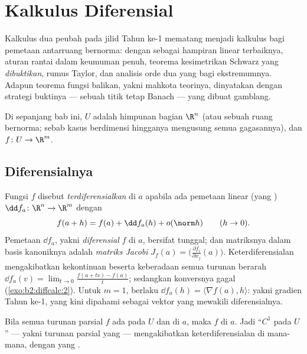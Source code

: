 \chapter{Kalkulus Diferensial}\label{ch:b2:diffcalc}

Kalkulus dua peubah pada jilid Tahun ke-1 mematang menjadi
kalkulus  bagi pemetaan antarruang bernorma: dengan
\emph{} sebagai hampiran linear terbaiknya, aturan rantai
dalam keumuman penuh, teorema kesimetrikan Schwarz yang \emph{dibuktikan},
rumus Taylor, dan analisis orde dua yang  bagi ekstremumnya. Adapun
teorema fungsi balikan, yakni mahkota teorinya, dinyatakan dengan
strategi buktinya --- sebuah titik tetap Banach --- yang dibuat gamblang.

Di sepanjang bab ini, $U$ adalah himpunan bagian  $\R^n$ (atau sebuah ruang
bernorma; sebab kasus berdimensi hingganya mengusung semua gagasannya), dan $f \colon U \to
\R^m$.

\section{Diferensialnya}

\begin{definition}\label{def:b2:diffcalc:differential}
Fungsi $f$ disebut \emph{terdiferensialkan} di $a$ apabila ada
pemetaan linear (yang ) $\dd f_a \colon \R^n \to \R^m$ dengan
\[
f(a + h) = f(a) + \dd f_a(h) + o(\norm h)
\qquad (h \to 0).
\]
Pemetaan $\dd f_a$, yakni \emph{diferensial}
$f$ di $a$, bersifat tunggal; dan matriksnya dalam basis kanoniknya adalah
\emph{matriks Jacobi} $J_f(a) =
\bigl(\frac{\partial f_i}{\partial x_j}(a)\bigr)$.
Keterdiferensialan mengakibatkan kekontinuan beserta keberadaan semua
turunan berarah $\dd f_a(v) = \lim_{t\to0}\frac{f(a + tv)
- f(a)}{t}$; sedangkan konversnya gagal
(\cref{exo:b2:diffcalc:2}). Untuk $m = 1$, berlaku $\dd f_a(h) = \langle
\nabla f(a), h\rangle$: yakni gradien Tahun ke-1, yang kini dipahami sebagai
vektor yang mewakili diferensialnya.
\end{definition}

\begin{theorem}[Kriteria $C^1$]\label{thm:b2:diffcalc:c1}
Bila semua turunan parsial $f$ ada pada $U$ dan 
di $a$, maka $f$  di $a$. Jadi ``$C^1$ pada $U$'' ---
yakni turunan parsial yang  --- mengakibatkan keterdiferensialan
di mana-mana, dengan  yang .
\end{theorem}

